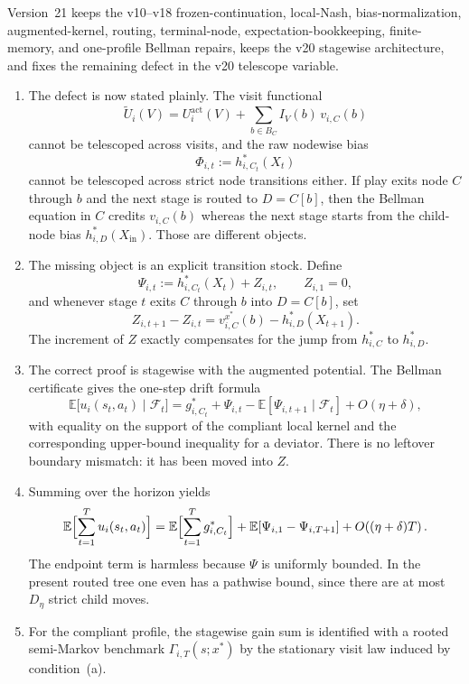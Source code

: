 \documentclass[12pt]{article}
\theoremstyle{definition}
\newcommand{\E}{\mathbb{E}}
\newcommand{\1}{\mathbf{1}}
\newcommand{\cF}{\mathcal{F}}
\begin{document}
Version~21 keeps the v10--v18 frozen-continuation, local-Nash,
bias-normalization, augmented-kernel, routing, terminal-node,
expectation-bookkeeping, finite-memory, and one-profile Bellman repairs, keeps
the v20 stagewise architecture, and fixes the remaining defect in the v20
telescope variable.

\begin{enumerate}[label=\textnormal{(\arabic*)},leftmargin=2.4em]
\item The defect is now stated plainly. The visit functional
\[
\widetilde U_i(V)=U_i^{\mathrm{act}}(V)+\sum_{b\in B_C}I_V(b)\,v_{i,C}(b)
\]
cannot be telescoped across visits, and the raw nodewise bias
\[
\Phi_{i,t}:=h_{i,C_t}^*(X_t)
\]
cannot be telescoped across strict node transitions either. If play exits node
$C$ through $b$ and the next stage is routed to $D=C[b]$, then the Bellman
equation in $C$ credits $v_{i,C}(b)$ whereas the next stage starts from the
child-node bias $h_{i,D}^*(X_{\mathrm{in}})$. Those are different objects.

\item The missing object is an explicit transition stock. Define
\[
\Psi_{i,t}:=h_{i,C_t}^*(X_t)+Z_{i,t},
\qquad
Z_{i,1}=0,
\]
and whenever stage $t$ exits $C$ through $b$ into $D=C[b]$, set
\[
Z_{i,t+1}-Z_{i,t}=v_{i,C}^{x^*}(b)-h_{i,D}^*(X_{t+1}).
\]
The increment of $Z$ exactly compensates for the jump from $h_{i,C}^*$ to
$h_{i,D}^*$.

\item The correct proof is stagewise with the augmented potential. The Bellman
certificate gives the one-step drift formula
\[
\E\bigl[u_i(s_t,a_t)\mid \cF_t\bigr]
=
g_{i,C_t}^*
+
\Psi_{i,t}
-
\E[\Psi_{i,t+1}\mid \cF_t]
+
O(\eta+\delta),
\]
with equality on the support of the compliant local kernel and the corresponding
upper-bound inequality for a deviator. There is no leftover boundary mismatch:
it has been moved into $Z$.

\item Summing over the horizon yields
\[
\E\Bigl[\sum_{t=1}^T u_i(s_t,a_t)\Bigr]
=
\E\Bigl[\sum_{t=1}^T g_{i,C_t}^*\Bigr]
+
\E[\Psi_{i,1}-\Psi_{i,T+1}]
+
O\!\left((\eta+\delta)T\right).
\]
The endpoint term is harmless because $\Psi$ is uniformly bounded. In the
present routed tree one even has a pathwise bound, since there are at most
$D_\eta$ strict child moves.

\item For the compliant profile, the stagewise gain sum is identified with a
rooted semi-Markov benchmark $\Gamma_{i,T}(s;x^*)$ by the stationary visit law
induced by condition~\textnormal{(a)}.


\end{enumerate}
\end{document}

